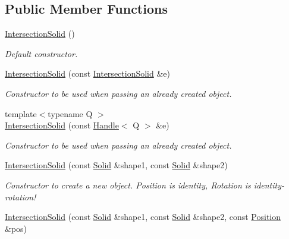 \subsection*{Public Member Functions}
\begin{DoxyCompactItemize}
\item 
\hyperlink{class_d_d4hep_1_1_geometry_1_1_intersection_solid_aa7d337896a7774ccba7dc4535fb5d561}{IntersectionSolid} ()
\begin{DoxyCompactList}\small\item\em Default constructor. \item\end{DoxyCompactList}\item 
\hyperlink{class_d_d4hep_1_1_geometry_1_1_intersection_solid_a31e5900024ffde253c9d88942db0a96c}{IntersectionSolid} (const \hyperlink{class_d_d4hep_1_1_geometry_1_1_intersection_solid}{IntersectionSolid} \&e)
\begin{DoxyCompactList}\small\item\em Constructor to be used when passing an already created object. \item\end{DoxyCompactList}\item 
{\footnotesize template$<$typename Q $>$ }\\\hyperlink{class_d_d4hep_1_1_geometry_1_1_intersection_solid_aea0aa8d4337c57f929b59aa876851e63}{IntersectionSolid} (const \hyperlink{class_d_d4hep_1_1_handle}{Handle}$<$ Q $>$ \&e)
\begin{DoxyCompactList}\small\item\em Constructor to be used when passing an already created object. \item\end{DoxyCompactList}\item 
\hyperlink{class_d_d4hep_1_1_geometry_1_1_intersection_solid_a87844b8aab46a41e8b1a94e06c7ea88b}{IntersectionSolid} (const \hyperlink{class_d_d4hep_1_1_geometry_1_1_solid__type}{Solid} \&shape1, const \hyperlink{class_d_d4hep_1_1_geometry_1_1_solid__type}{Solid} \&shape2)
\begin{DoxyCompactList}\small\item\em Constructor to create a new object. Position is identity, Rotation is identity-\/rotation! \item\end{DoxyCompactList}\item 
\hyperlink{class_d_d4hep_1_1_geometry_1_1_intersection_solid_a4b62f2ea208c14e2d2ea4006bce4cc67}{IntersectionSolid} (const \hyperlink{class_d_d4hep_1_1_geometry_1_1_solid__type}{Solid} \&shape1, const \hyperlink{class_d_d4hep_1_1_geometry_1_1_solid__type}{Solid} \&shape2, const \hyperlink{namespace_d_d4hep_1_1_geometry_a55083902099d03506c6db01b80404900}{Position} \&pos)

\end{DoxyCompactItemize}
